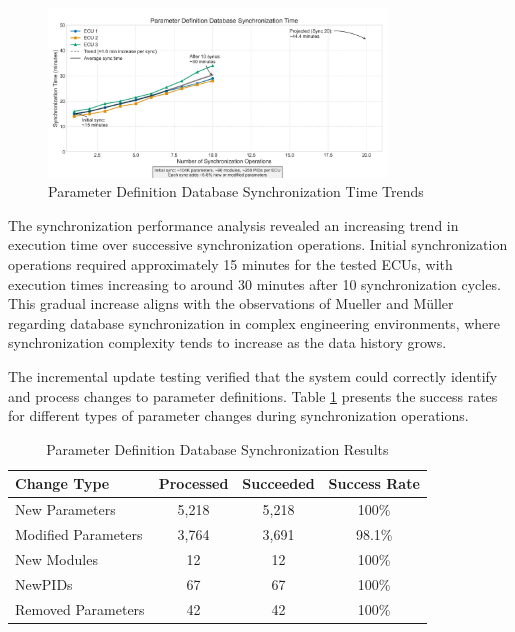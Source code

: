 \begin{figure}[h]
    \centering
    \includegraphics[width=0.8\textwidth]{figures/pdd_sync_time_graph.png}
    \caption{Parameter Definition Database Synchronization Time Trends}
    \label{fig:pdd-sync-time}
\end{figure}

The synchronization performance analysis revealed an increasing trend in execution time over successive synchronization operations. Initial synchronization operations required approximately 15 minutes for the tested \acp{ECU}, with execution times increasing to around 30 minutes after 10 synchronization cycles. This gradual increase aligns with the observations of Mueller and Müller \cite{mueller2018conception} regarding database synchronization in complex engineering environments, where synchronization complexity tends to increase as the data history grows.

The incremental update testing verified that the system could correctly identify and process changes to parameter definitions. Table \ref{tab:pdd-sync-results} presents the success rates for different types of parameter changes during synchronization operations.

\begin{table}[h]
\centering
\caption{Parameter Definition Database Synchronization Results}
\label{tab:pdd-sync-results}
\begin{tabular}{|l|c|c|c|}
\hline
\textbf{Change Type} & \textbf{Processed} & \textbf{Succeeded} & \textbf{Success Rate} \\
\hline
New Parameters & 5,218 & 5,218 & 100\% \\
\hline
Modified Parameters & 3,764 & 3,691 & 98.1\% \\
\hline
New Modules & 12 & 12 & 100\% \\
\hline
New\acp{PID} & 67 & 67 & 100\% \\
\hline
Removed Parameters & 42 & 42 & 100\% \\
\hline
\end{tabular}
\end{table}

